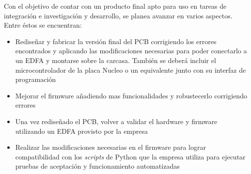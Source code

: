 Con el objetivo de contar con un producto final apto para uso en tareas de integración e investigación y desarrollo, se planea avanzar en varios aspectos. Entre éstos se encuentran:

\begin{itemize}
\item Rediseñar y fabricar la versión final del PCB corrigiendo los errores encontrados y aplicando las modificaciones necesarias para poder conectarlo a un EDFA y montarse sobre la carcasa. También se deberá incluir el microcontrolador de la placa Nucleo o un equivalente junto con su interfaz de programación
\item Mejorar el firmware añadiendo mas funcionalidades y robustecerlo corrigiendo errores
\item Una vez rediseñado el PCB, volver a validar el hardware y firmware utilizando un EDFA provisto por la empresa
\item Realizar las modificaciones necesarias en el firmware para lograr compatibilidad con los \textit{scripts} de Python que la empresa utiliza para ejecutar pruebas de aceptación y funcionamiento automatizadas
\end{itemize}